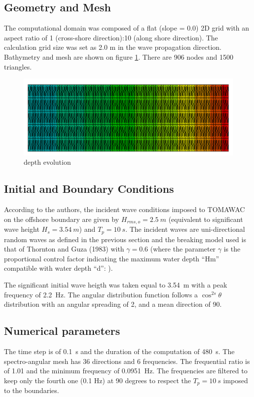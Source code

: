 \subsection{Geometry and Mesh}
%
The computational domain was composed of a flat (slope = 0.0) 2D grid with an aspect ratio of 1 (cross-shore direction):10 (along shore direction). The calculation grid size was set as 2.0 m in the wave propagation direction.
Bathymetry and mesh are shown on figure \ref{bathydean}. There are 906 nodes and 1500 triangles.
\begin{figure} [!h]
\centering
\includegraphics[scale = 0.8]{bathy.png}
 \caption{depth evolution}
\label{bathydean}
\end{figure}

\subsection{Initial and Boundary Conditions}
%
According to the authors, the incident wave conditions imposed to TOMA\-WAC on the offshore boundary are given by $H_{rms,o} = 2.5~m$ (equivalent to significant wave height $H_s = 3.54~m$) and $T_p = 10~s$.
The incident waves are uni-directional random waves as defined in the previous section and the breaking model used is that of Thornton and Guza (1983) with  $\gamma=0.6$ (where the parameter $\gamma$  is the proportional control factor indicating the maximum water depth “Hm” compatible with water depth “d”: ).

The significant initial wave heigth was taken equal to 3.54~m with a peak frequency of 2.2~Hz. The angular distribution function follows a $\cos^{2s} \theta$ distribution with an angular spreading of 2, and a mean direction of 90.

\subsection{Numerical parameters}
%
The time step is of 0.1~s and the duration of the computation of 480~s. The spectro-angular mesh has 36 directions and 6 frequencies. The frequential ratio is of 1.01 and the minimum frequency of 0.0951~Hz. The frequencies are filtered to keep only the fourth one (0.1 Hz) at 90 degrees to respect the $T_p= 10~s$ imposed to the boundaries.


